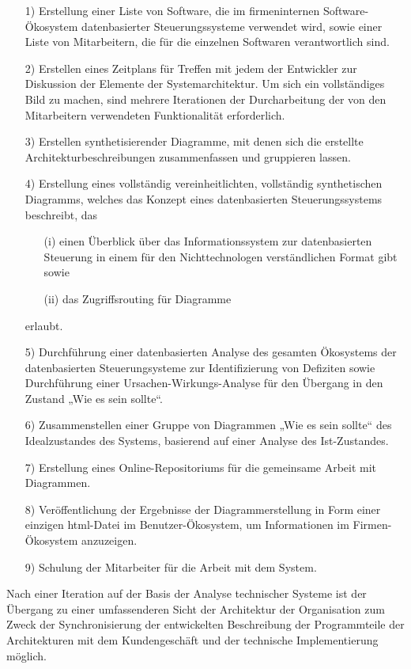 \documentclass[11pt,a4paper]{article}
\begin{document}
\begin{itemize}
\item[1)] Erstellung einer Liste von Software, die im firmeninternen
  Software-Ökosystem datenbasierter Steuerungssysteme verwendet wird, sowie
  einer Liste von Mitarbeitern, die für die einzelnen Softwaren verantwortlich
  sind.
\item[2)] Erstellen eines Zeitplans für Treffen mit jedem der Entwickler zur
  Diskussion der Elemente der Systemarchitektur. Um sich ein vollständiges
  Bild zu machen, sind mehrere Iterationen der Durcharbeitung der von den
  Mitarbeitern verwendeten Funktionalität erforderlich.
\item[3)] Erstellen synthetisierender Diagramme, mit denen sich die erstellte
  Architekturbeschreibungen zusammenfassen und gruppieren lassen.
\item[4)] Erstellung eines vollständig vereinheitlichten, vollständig
  synthetischen Diagramms, welches das Konzept eines datenbasierten
  Steuerungssystems beschreibt, das 
  \begin{itemize}
  \item[(i)] einen Überblick über das Informationssystem zur datenbasierten
    Steuerung in einem für den Nichttechnologen verständlichen Format gibt
    sowie
  \item[(ii)] das Zugriffsrouting für Diagramme
  \end{itemize}
  erlaubt.
\item[5)] Durchführung einer datenbasierten Analyse des gesamten Ökosystems
  der datenbasierten Steuerungsysteme zur Identifizierung von Defiziten sowie
  Durchführung einer Ursachen-Wirkungs-Analyse für den Übergang in den Zustand
  „Wie es sein sollte“.
\item[6)] Zusammenstellen einer Gruppe von Diagrammen „Wie es sein sollte“ des
  Idealzustandes des Systems, basierend auf einer Analyse des Ist-Zustandes.
\item[7)] Erstellung eines Online-Repositoriums für die gemeinsame Arbeit mit
  Diagrammen.
\item[8)] Veröffentlichung der Ergebnisse der Diagrammerstellung in Form einer
  einzigen html-Datei im Benutzer-Ökosystem, um Informationen im
  Firmen-Ökosystem anzuzeigen.
\item[9)] Schulung der Mitarbeiter für die Arbeit mit dem System.
\end{itemize}
Nach einer Iteration auf der Basis der Analyse technischer Systeme ist der
Übergang zu einer umfassenderen Sicht der Architektur der Organisation zum
Zweck der Synchronisierung der entwickelten Beschreibung der Programmteile der
Architekturen mit dem Kundengeschäft und der technische Implementierung
möglich.
\end{document}
